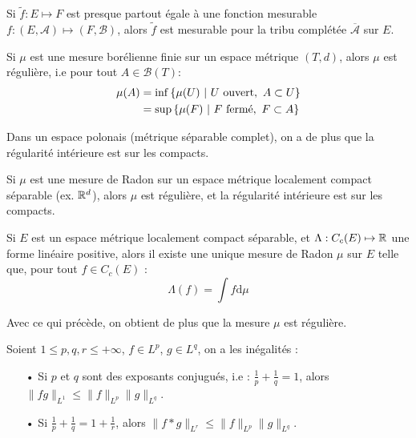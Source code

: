\documentclass[11pt,a4paper]{article}
\begin{document}
\begin{rmq}
Si $\tilde{f} : E \mapsto F$ est presque partout égale à une fonction mesurable $f : (E,\mathcal{A}) \mapsto (F,\mathcal{B})$, alors $\tilde{f}$ est mesurable pour la tribu complétée $\overline{\mathcal{A}}$ sur $E$.
\end{rmq}

\begin{thm}
Si $\mu$ est une mesure borélienne finie sur un espace métrique $(T,d)$, alors $\mu$ est régulière, i.e pour tout $A \in \mathcal{B}(T)$:
\begin{align*}
\mu(A) &= \inf \left\{ \mu(U) \ \middle| \ U \text{ ouvert},\  A \subset U \right\} \\
&=\sup \left\{ \mu(F) \ \middle| \ F \text{ fermé}, \ F \subset A \right\}
\end{align*}
\end{thm}


\begin{rmq}
Dans un espace polonais (métrique séparable complet), on a de plus que la régularité intérieure est sur les compacts.
\end{rmq}

\begin{thm}
Si $\mu$ est une mesure de Radon sur un espace métrique localement compact séparable (ex. $\mathbb R^d$), alors $\mu$ est régulière, et  la régularité intérieure est sur les compacts. 
\end{thm}

\begin{thm}
Si $E$ est un espace métrique localement compact séparable, et $\Lambda : C_c(E) \mapsto \mathbb R$ une forme linéaire positive, alors il existe une unique mesure de Radon $\mu$ sur $E$ telle que, pour tout $f\in C_c(E)$ : 
\[\Lambda(f) = \int f \mathrm{d}\mu\]
\end{thm}

\begin{rmq}
Avec ce qui précède, on obtient de plus que la mesure $\mu$ est régulière.
\end{rmq}

\begin{thm}
Soient $ 1 \leq p,q,r \leq +\infty$, $f\in L^p$, $g \in L^q$, on a les inégalités :
\begin{itemize}
\item[•] Si $p$ et $q$ sont des exposants conjugués, i.e : $\frac{1}{p} + \frac{1}{q} = 1$, alors $\|fg\|_{L^1} \leq \|f\|_{L^p}\|g\|_{L^q}$.
\item[•] Si $\frac{1}{p} + \frac{1}{q} = 1 + \frac{1}{r}$, alors $\|f*g\|_{L^r} \leq \|f\|_{L^p}\|g\|_{L^q}$.
\end{itemize}
\end{thm}
\end{document}
